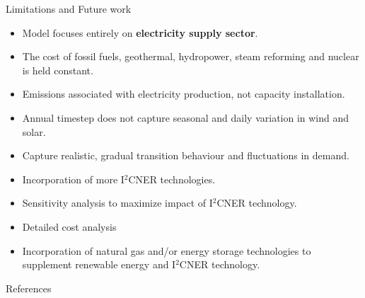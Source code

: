 \documentclass[final]{beamer}
\newlength{\onecolwid}
\newlength{\threecolwid}
\begin{document}
\begin{frame}[t]
\begin{columns}[t,totalwidth=\threecolwid]
\begin{column}{\onecolwid}
\begin{block}{Limitations and Future work}
    \begin{itemize}
    
    \item Model focuses entirely on \textbf{electricity supply sector}.
    
    \item The cost of fossil fuels, geothermal, hydropower, steam reforming and nuclear is held constant.
        
    \item Emissions associated with electricity production, not capacity installation.
    
    \item Annual timestep does not capture seasonal and daily variation in wind and solar.    
    
    \item Capture realistic, gradual transition behaviour and fluctuations in demand.
    
    \item Incorporation of more I$^2$CNER technologies.
    
    \item Sensitivity analysis to maximize impact of I$^2$CNER technology.
    
    \item Detailed cost analysis
    
    \item Incorporation of natural gas and/or energy storage technologies to supplement renewable energy and I$^2$CNER technology. 
    
    \end{itemize}
\end{block}

\begin{block}{References}
        {\footnotesize 
        }
\end{block}




\end{column}
\end{columns}
\end{frame}
\end{document}
